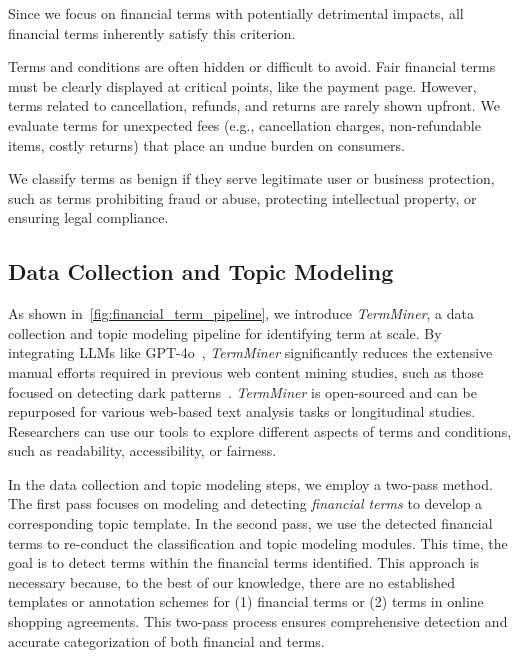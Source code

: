  Since we focus on financial terms with potentially detrimental impacts, all financial terms inherently satisfy this criterion.


 Terms and conditions are often hidden or difficult to avoid. Fair financial terms must be clearly displayed at critical points, like the payment page. However, terms related to cancellation, refunds, and returns are rarely shown upfront. We evaluate terms for unexpected fees (e.g., cancellation charges, non-refundable items, costly returns) that place an undue burden on consumers.


 We classify terms as benign if they serve legitimate user or business protection, such as terms prohibiting fraud or abuse, protecting intellectual property, or ensuring legal compliance.



\subsection{Data Collection and Topic Modeling}
\label{ssec:data_collection_and_topic_modeling}

As shown in~\autoref{fig:financial_term_pipeline}, we introduce \textit{TermMiner}, a data collection and topic modeling pipeline for identifying \termname term at scale.  By integrating LLMs like GPT-4o~\citep{openai2023gpt4}, \textit{TermMiner} significantly reduces the extensive manual efforts required in previous web content mining studies, such as those focused on detecting dark patterns~\citep{mathur2019dark}. 
\textit{TermMiner} is open-sourced and can be repurposed for various web-based text analysis tasks or longitudinal studies. Researchers can use our tools to explore different aspects of terms and conditions, such as readability, accessibility, or fairness.


In the data collection and topic modeling steps, we employ a two-pass method. The first pass focuses on modeling and detecting \textit{financial terms} to develop a corresponding topic template. In the second pass, we use the detected financial terms to re-conduct the classification and topic modeling modules. This time, the goal is to detect \termname terms within the financial terms identified. This approach is necessary because, to the best of our knowledge, there are no established templates or annotation schemes for (1) financial terms or (2) \termname terms in online shopping agreements. This two-pass process ensures comprehensive detection and accurate categorization of both financial and \termname terms.


